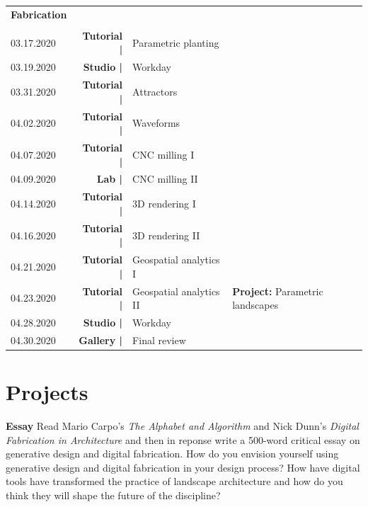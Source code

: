 \documentclass[11pt,article,oneside]{memoir}
\begin{document}
\begin{table}[H]
\begin{tabular}{l r @{\hskip 0.1cm} l @{\hskip 0.5cm} l}
\\
\textbf{Fabrication}\\
\\
03.17.2020 & \textbf{Tutorial |} & Parametric planting \\
03.19.2020 & \textbf{Studio |} & Workday\\
%
%
03.31.2020 & \textbf{Tutorial |} & Attractors \\
04.02.2020 & \textbf{Tutorial |} & Waveforms \\
%
04.07.2020 & \textbf{Tutorial |} & CNC milling I \\
04.09.2020 & \textbf{Lab |} & CNC milling II \\
%
04.14.2020 & \textbf{Tutorial |} & 3D rendering I \\
04.16.2020 & \textbf{Tutorial |} & 3D rendering II \\
%
04.21.2020 & \textbf{Tutorial |} & Geospatial analytics I\\
04.23.2020 & \textbf{Tutorial |} & Geospatial analytics II & \textbf{Project:} Parametric landscapes \\ 
%
04.28.2020 & \textbf{Studio |} & Workday\\
04.30.2020 & \textbf{Gallery |} & Final review\\ 
%
\end{tabular}
\end{table}

\clearpage

\section{Projects}

\noindent \textbf{Essay}
Read Mario Carpo's \emph{The Alphabet and Algorithm}
and Nick Dunn's \emph{Digital Fabrication in Architecture}
and then in reponse write a 500-word critical essay
on generative design and digital fabrication.
How do you envision yourself using
generative design and digital fabrication
in your design process?
How have digital tools have transformed 
the practice of landscape architecture
and how do you think they will shape 
the future of the discipline?

\nocite{*} \printbibliography[keyword=intro, heading=none]
\end{document}
